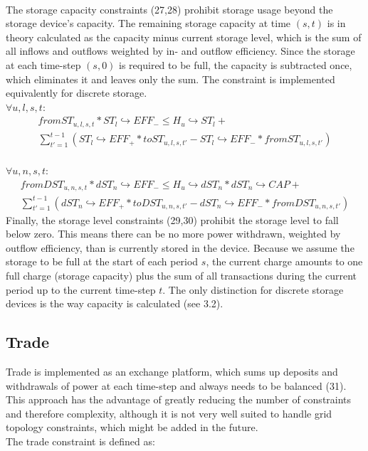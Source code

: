 \documentclass[
	11pt,								%
	DIV10,								%
	a4paper,         					%
	oneside,							%
	headheight=20pt,					%
	footheight=20pt,					%
    parskip=full,						%
    listof=totoc,						%
	bibliography=totoc,					%
	index=totoc,						%
]{scrartcl}
\begin{document}
	\\
	The storage capacity constraints (27,28) prohibit storage usage beyond the storage device's capacity. The remaining storage capacity at time $(s,t)$ is in theory calculated as the capacity minus current storage level, which is the sum of all inflows and outflows weighted by in- and outflow efficiency. Since the storage at each time-step $(s,0)$ is required to be full, the capacity is subtracted once, which eliminates it and leaves only the sum. The constraint is implemented equivalently for discrete storage. 
	\\
	$\forall u,l,s,t$:
	\begin{equation}
	\begin{split}
		fromST_{u,l,s,t} * ST_l \hookrightarrow EFF_{-} \leq H_u \hookrightarrow ST_l +\\
		\sum_{t'=1}^{t-1}(ST_l \hookrightarrow EFF_{+} * toST_{u,l,s,t'} - ST_l \hookrightarrow EFF_{-} * fromST_{u,l,s,t'})
		\end{split}
	\end{equation}
	\\
	$\forall u,n,s,t$:
	\begin{equation}
	\begin{split}
		fromDST_{u,n,s,t} * dST_n \hookrightarrow EFF_{-} \leq H_u \hookrightarrow dST_n * dST_n \hookrightarrow CAP +  \\
		\sum_{t'=1}^{t-1}(dST_n \hookrightarrow EFF_{+} * toDST_{u,n,s,t'} - dST_n \hookrightarrow EFF_{-} * fromDST_{u,n,s,t'})
	\end{split}
	\end{equation}
	Finally, the storage level constraints (29,30) prohibit the storage level to fall below zero. This means there can be no more power withdrawn, weighted by outflow efficiency, than is currently stored in the device. Because we assume the storage to be full at the start of each period $s$, the current charge amounts to one full charge (storage capacity) plus the sum of all transactions during the current period up to the current time-step $t$. The only distinction for discrete storage devices is the way capacity is calculated (see 3.2).




\subsection{Trade}
Trade is implemented as an exchange platform, which sums up deposits and withdrawals of power at each time-step and always needs to be balanced (31). This approach has the advantage of greatly reducing the number of constraints and therefore complexity, although it is not very well suited to handle grid topology constraints, which might be added in the future.\\
The trade constraint is defined as:
\\
\end{document}
